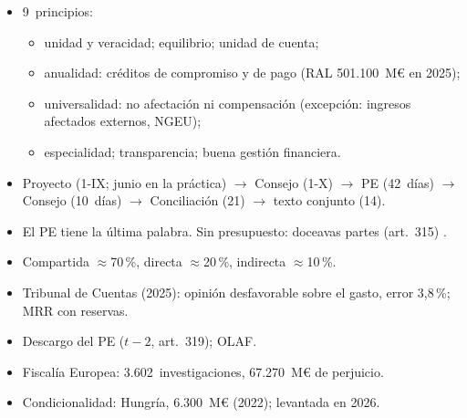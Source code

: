 \documentclass{article}
\begin{document}
\begin{columnas}
\begin{itemize}
\item 9~principios:
  \begin{itemize}
  \item unidad y veracidad; equilibrio; unidad de cuenta;
  \item anualidad: créditos de compromiso y de pago (RAL 501.100~M€ en 2025);
  \item universalidad: no afectación ni compensación (excepción: ingresos afectados externos, NGEU);
  \item especialidad; transparencia; buena gestión financiera.
  \end{itemize}
\end{itemize}
\begin{itemize}
\item Proyecto (1-IX; junio en la práctica) $\to$ Consejo (1-X) $\to$ PE (42~días) $\to$ Consejo (10~días) $\to$ Conciliación (21) $\to$ texto conjunto (14).
\item El PE tiene la última palabra. Sin presupuesto: doceavas partes (art.~315) .
\end{itemize}
\begin{itemize}
\item Compartida $\approx$70\,\%, directa $\approx$20\,\%, indirecta $\approx$10\,\%.
\end{itemize}
\begin{itemize}
\item Tribunal de Cuentas (2025): opinión desfavorable sobre el gasto, error 3,8\,\%; MRR con reservas.
\item Descargo del PE ($t-2$, art.~319); OLAF.
\item Fiscalía Europea: 3.602~investigaciones, 67.270~M€ de perjuicio.
\item Condicionalidad: Hungría, 6.300~M€ (2022); levantada en 2026.
\end{itemize}


\end{columnas}
\end{document}

